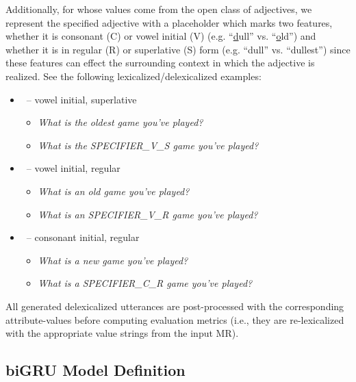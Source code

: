 \label{app:specifier} Additionally, for  whose values come from the open class of
adjectives, we represent the specified adjective with a placeholder which
marks two features, whether it is consonant (C) or vowel initial (V) (e.g.
``\ul{d}ull'' vs. ``\ul{o}ld'') and whether it is in regular (R) or
superlative (S) form (e.g. ``dull'' vs. ``dullest'') since these features can
effect the surrounding context in which the adjective is realized.  See the
following lexicalized/delexicalized examples:
\begin{itemize}
        \item {}~-- vowel initial, superlative
\begin{itemize}
    \item \textit{What is the oldest game you've played?}
    \item \textit{What is the SPECIFIER\_V\_S game you've played?}
\end{itemize}
        \item {}~-- vowel initial, regular

\begin{itemize}
    \item \textit{What is an old game you've played?}
    \item \textit{What is an SPECIFIER\_V\_R game you've played?}
\end{itemize}

        \item {}~-- consonant initial, regular

\begin{itemize}
    \item \textit{What is a new game you've played?}
    \item \textit{What is a SPECIFIER\_C\_R game you've played?}
\end{itemize}
\end{itemize}

All generated delexicalized utterances are post-processed with the
corresponding attribute-values before computing evaluation metrics (i.e., 
they are re-lexicalized with the appropriate value strings from the input MR).





\subsection{biGRU Model Definition}
\label{sec:bahdanau}

